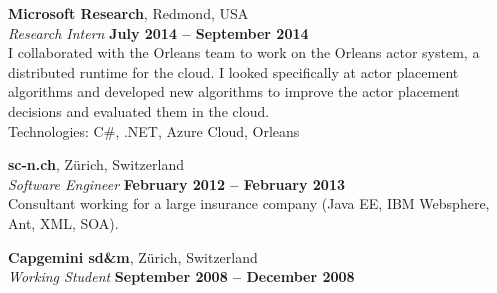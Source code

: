 \documentclass[margin,line]{resume}
\begin{document}
\begin{resume}

\textbf{Microsoft Research}, Redmond, USA \vspace{2mm}\\\vspace{1mm}%
\textsl{Research Intern} \hfill \textbf{July 2014 -- September 2014}\\
I collaborated with the Orleans team to work on the Orleans
actor system, a distributed runtime for the cloud. I looked specifically at
actor placement algorithms and developed new algorithms to improve the actor placement
decisions and evaluated them in the cloud.\\ Technologies: C\#, .NET, Azure Cloud, Orleans


\textbf{sc-n.ch}, Zürich, Switzerland \vspace{2mm}\\\vspace{1mm}%
\textsl{Software Engineer} \hfill \textbf{February 2012 -- February 2013}\\
Consultant working for a large insurance company (Java EE, IBM Websphere, Ant, XML, SOA).


\textbf{Capgemini sd\&m}, Zürich, Switzerland \vspace{2mm}\\\vspace{1mm}%
\textsl{Working Student} \hfill \textbf{September 2008 -- December 2008}\\



\end{resume}
\end{document}
